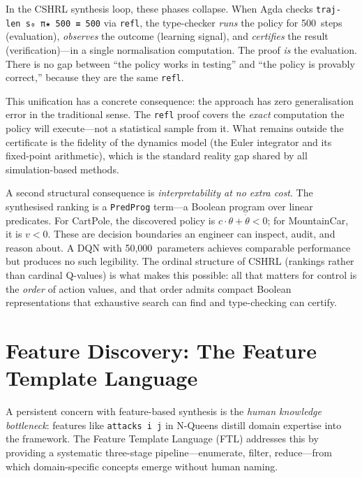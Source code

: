 \documentclass[9pt,a4paper]{article}
\theoremstyle{plain}
\theoremstyle{definition}
\theoremstyle{remark}
\begin{document}
In the CSHRL synthesis loop, these phases collapse.  When Agda checks \texttt{traj-len~s₀~π★~500~≡~500} via \texttt{refl}, the type-checker \emph{runs} the policy for 500~steps (evaluation), \emph{observes} the outcome (learning signal), and \emph{certifies} the result (verification)---in a single normalisation computation.  The proof \emph{is} the evaluation.  There is no gap between ``the policy works in testing'' and ``the policy is provably correct,'' because they are the same \texttt{refl}.

This unification has a concrete consequence: the approach has zero generalisation error in the traditional sense.  The \texttt{refl} proof covers the \emph{exact} computation the policy will execute---not a statistical sample from it.  What remains outside the certificate is the fidelity of the dynamics model (the Euler integrator and its fixed-point arithmetic), which is the standard reality gap shared by all simulation-based methods.

A second structural consequence is \emph{interpretability at no extra cost}.  The synthesised ranking is a \texttt{PredProg} term---a Boolean program over linear predicates.  For CartPole, the discovered policy is $c \cdot \theta + \dot\theta < 0$; for MountainCar, it is $v < 0$.  These are decision boundaries an engineer can inspect, audit, and reason about.  A DQN with 50,000~parameters achieves comparable performance but produces no such legibility.  The ordinal structure of CSHRL (rankings rather than cardinal Q-values) is what makes this possible: all that matters for control is the \emph{order} of action values, and that order admits compact Boolean representations that exhaustive search can find and type-checking can certify.

\section{Feature Discovery: The Feature Template Language}
\label{sec:ftl}

A persistent concern with feature-based synthesis is the \emph{human knowledge bottleneck}: features like \texttt{attacks~i~j} in N-Queens distill domain expertise into the framework.
The Feature Template Language (FTL) addresses this by providing a systematic three-stage pipeline---enumerate, filter, reduce---from which domain-specific concepts emerge without human naming.
\end{document}
